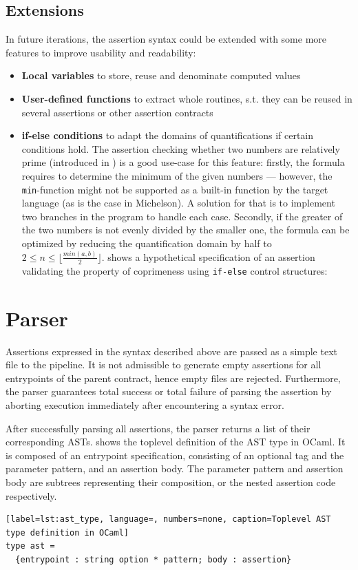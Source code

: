 \subsection{Extensions}\label{sec:ext}
In future iterations, the assertion syntax could be extended with some more features to improve usability and readability:
\begin{itemize}
\item \textbf{Local variables} to store, reuse and denominate computed values
\item \textbf{User-defined functions} to extract whole routines, s.t. they can be reused in several assertions or other assertion contracts
\item \textbf{if-else conditions} to adapt the domains of quantifications if certain conditions hold. The assertion checking whether two numbers are relatively prime (introduced in ) is a good use-case for this feature: firstly, the formula requires to determine the minimum of the given numbers --- however, the \texttt{min}-function might not be supported as a built-in function by the target language (as is the case in Michelson). A solution for that is to implement two branches in the program to handle each case. Secondly, if the greater of the two numbers is not evenly divided by the smaller one, the formula can be optimized by reducing the quantification domain by half to $2 \le n \le \lfloor \frac{min(a,b)}{2} \rfloor$.  shows a hypothetical specification of an assertion validating the property of coprimeness using \texttt{if-else} control structures:

\end{itemize}

\section{Parser}
Assertions expressed in the syntax described above are passed as a simple text file to the pipeline. It is not admissible to generate empty assertions for all entrypoints of the parent contract, hence empty files are rejected. Furthermore, the parser guarantees total success or total failure of parsing the assertion by aborting execution immediately after encountering a syntax error. 

After successfully parsing all assertions, the parser returns a list of their corresponding ASTs.  shows the toplevel definition of the AST type in OCaml. It is composed of an entrypoint specification, consisting of an optional tag and the parameter pattern, and an assertion body. The parameter pattern and assertion body are subtrees representing their composition, or the nested assertion code respectively.
\begin{lstlisting}[label=lst:ast_type, language=, numbers=none, caption=Toplevel AST type definition in OCaml]
type ast =
  {entrypoint : string option * pattern; body : assertion}
\end{lstlisting}

